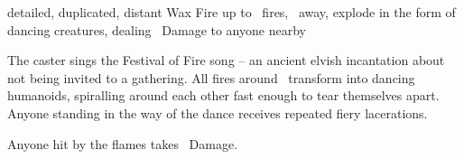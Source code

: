   {detailed, duplicated, distant}%
  {Wax}%
  {Fire}%
  {}%
  {up to \spellArea\ fires, \spellRange\ away, explode in the form of dancing creatures, dealing \showDam\ Damage to anyone nearby}%
  {
    The caster sings the Festival of Fire song -- an ancient elvish incantation about not being invited to a gathering.
    All fires around \spellRange\ transform into dancing humanoids, spiralling around each other fast enough to tear themselves apart.
    Anyone standing in the way of the dance receives repeated fiery lacerations.

    Anyone hit by the flames takes \showDam\ Damage.
  }

